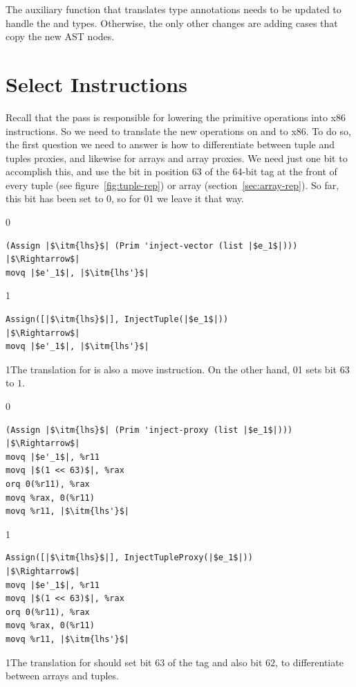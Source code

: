 \documentclass[7x10]{TimesAPriori_MIT}%
\def\racketEd{0}
\def\pythonEd{1}
\def\edition{0}
\newcommand{\racket}[1]{{\if\edition\racketEd{#1}\fi}}
\newcommand{\python}[1]{{\if\edition\pythonEd #1\fi}}
\numberwithin{theorem}{chapter}
\numberwithin{definition}{chapter}
\numberwithin{equation}{chapter}
\begin{document}
The auxiliary function that translates type annotations needs to be
updated to handle the \PTUPLETYNAME{} and \PARRAYTYNAME{} types.
%
Otherwise, the only other changes are adding cases that copy the new AST nodes.

\section{Select Instructions}
\label{sec:select-instructions-gradual}

Recall that the  pass is responsible for
lowering the primitive operations into x86 instructions.  So we need
to translate the new operations on \PTUPLETYNAME{} and \PARRAYTYNAME{}
to x86.  To do so, the first question we need to answer is how to
differentiate between tuple and tuples proxies, and likewise for
arrays and array proxies.  We need just one bit to accomplish this,
and use the bit in position $63$ of the 64-bit tag at the front of
every tuple (see figure~\ref{fig:tuple-rep}) or array
(section~\ref{sec:array-rep}). So far, this bit has been set to $0$,
so for \racket{}\python{} we leave
it that way.
{\if\edition\racketEd    
\begin{lstlisting}
(Assign |$\itm{lhs}$| (Prim 'inject-vector (list |$e_1$|)))
|$\Rightarrow$|  
movq |$e'_1$|, |$\itm{lhs'}$|
\end{lstlisting}
\fi}
{\if\edition\pythonEd    
\begin{lstlisting}
Assign([|$\itm{lhs}$|], InjectTuple(|$e_1$|))
|$\Rightarrow$|  
movq |$e'_1$|, |$\itm{lhs'}$|
\end{lstlisting}
\fi}
\python{The translation for  is also a move instruction.}
\noindent On the other hand,
\racket{}\python{} sets bit
$63$ to $1$.
%
{\if\edition\racketEd
\begin{lstlisting}  
(Assign |$\itm{lhs}$| (Prim 'inject-proxy (list |$e_1$|)))
|$\Rightarrow$|  
movq |$e'_1$|, %r11
movq |$(1 << 63)$|, %rax
orq 0(%r11), %rax
movq %rax, 0(%r11)
movq %r11, |$\itm{lhs'}$|
\end{lstlisting}
\fi}
{\if\edition\pythonEd
\begin{lstlisting}  
Assign([|$\itm{lhs}$|], InjectTupleProxy(|$e_1$|))
|$\Rightarrow$|  
movq |$e'_1$|, %r11
movq |$(1 << 63)$|, %rax
orq 0(%r11), %rax
movq %rax, 0(%r11)
movq %r11, |$\itm{lhs'}$|
\end{lstlisting}
\fi}
\python{\noindent The translation for  should set bit $63$
  of the tag and also bit $62$, to differentiate between arrays and tuples.}
\end{document}
